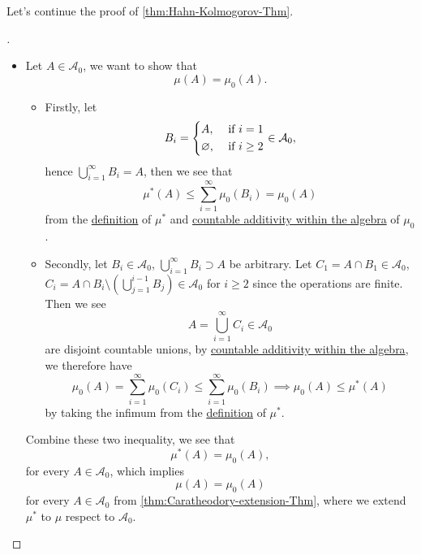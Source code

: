 Let's continue the proof of \autoref{thm:Hahn-Kolmogorov-Thm}.
\begin{proof}[\unskip\nopunct]\label{pf:Hahn-Kolmogorov-Thm-cont}
	\begin{itemize}
		\item Let \(A\in \mathcal{A} _0\), we want to show that
		      \[
			      \mu (A) = \mu_0(A).
		      \]
		      \begin{itemize}
			      \item Firstly, let
			            \[
				            B_{i} = \begin{dcases}
					            A,            & \text{ if } i= 1    \\
					            \varnothing , & \text{ if } i\geq 2
				            \end{dcases}\in \mathcal{A} _0,
			            \]
			            hence \(\bigcup\limits_{i=1}^{\infty} B_{i} = A\), then we see that
			            \[
				            \mu ^{*} (A)\leq \sum\limits_{i=1}^{\infty} \mu _0(B_{i}) = \mu _0(A)
			            \]
			            from the \hyperref[prop:outer-measure]{definition} of \(\mu ^{*} \) and \hyperref[def:pre-measure-countable-additivity-within-the-algebra]{countable additivity within the algebra}
			            of \(\mu _0\).
			      \item Secondly, let \(B_{i}\in \mathcal{A} _0\), \(\bigcup\limits_{i=1}^{\infty} B_{i}\supset A\) be arbitrary.
			            Let \(C_1 = A\cap B_1\in \mathcal{A} _0\), \(C_{i} = A\cap B_{i}\setminus \left(\bigcup\limits_{j=1}^{i-1} B_{j}\right)\in \mathcal{A} _0\) for \(i\geq 2\)
			            since the operations are finite. Then we see
			            \[
				            A = \bigcup\limits_{i=1}^{\infty} C_{i}\in \mathcal{A} _0
			            \]
			            are disjoint countable unions, by \hyperref[def:pre-measure-countable-additivity-within-the-algebra]{countable additivity within the algebra},
			            we therefore have
			            \[
				            \mu _0(A) = \sum\limits_{i=1}^{\infty} \mu _0(C_{i}) \leq \sum\limits_{i=1}^{\infty} \mu_0 (B_{i})\implies \mu _0(A)\leq \mu ^{*} (A)
			            \]
			            by taking the infimum from the \hyperref[prop:outer-measure]{definition} of \(\mu ^{*} \).
		      \end{itemize}
		      Combine these two inequality, we see that
		      \[
			      \mu ^{*} (A) = \mu _0(A),
		      \]
		      for every \(A\in\mathcal{A} _0\), which implies
		      \[
			      \mu (A) = \mu _0(A)
		      \]
		      for every \(A\in \mathcal{A}_0\) from \autoref{thm:Caratheodory-extension-Thm}, where we extend \(\mu ^{*} \) to \(\mu \) respect to \(\mathcal{A}_0\).
	\end{itemize}
\end{proof}

